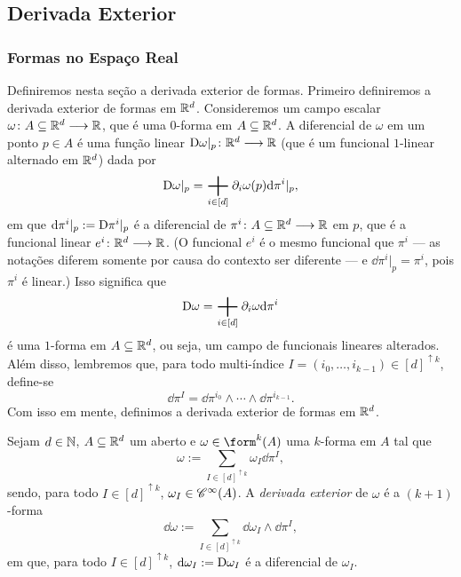 \subsection{Derivada Exterior}

\subsubsection{Formas no Espaço Real}

Definiremos nesta seção a derivada exterior de formas. Primeiro definiremos a derivada exterior de formas em $\mathbb{R}^d$. Consideremos um campo escalar $\omega\colon A \subseteq \mathbb{R}^d \longrightarrow \mathbb{R}$, que é uma $0$-forma em $A \subseteq \mathbb{R}^d$. A diferencial de $\omega$ em um ponto $p \in A$ é uma função linear $\mathrm{D} \omega|_p\colon \mathbb{R}^d \longrightarrow \mathbb{R}$ (que é um funcional $1$-linear alternado em $\mathbb{R}^d$) dada por
	\begin{equation*}
	\D \omega|_p = \sum_{i \in [d]} \partial_i \omega(p) \dd\pi^i|_p,
	\end{equation*}
em que $\mathrm{d}\pi^i|_p := \mathrm{D}\pi^i|_p$ é a diferencial de $\pi^i\colon A \subseteq \mathbb{R}^d \longrightarrow \mathbb{R}$ em $p$, que é a funcional linear $e^i\colon \mathbb{R}^d \longrightarrow \mathbb{R}$. (O funcional $e^i$ é o mesmo funcional que $\pi^i$ --- as notações diferem somente por causa do contexto ser diferente --- e $\dd\pi^i|_p=\pi^i$, pois $\pi^i$ é linear.) Isso significa que
	\begin{equation*}
	\D\omega = \sum_{i \in [d]} \partial_i \omega \dd\pi^i
	\end{equation*}
é uma $1$-forma em $A \subseteq \mathbb{R}^d$, ou seja, um campo de funcionais lineares alterados. Além disso, lembremos que, para todo multi-índice $I=(i_0,\ldots,i_{k-1}) \in [d]^{\uparrow k}$, define-se
	\begin{equation*}
	\dd\pi^I = \dd\pi^{i_0} \wedge \cdots \wedge \dd\pi^{i_{k-1}}.
	\end{equation*}
Com isso em mente, definimos a derivada exterior de formas em $\mathbb{R}^d$.

\begin{defi}
Sejam $d \in \mathbb{N}$, $A \subseteq \mathbb{R}^d$ um aberto e $\omega \in \form^k(A)$ uma $k$-forma em $A$ tal que
	\begin{equation*}
	\omega := \sum_{I \in [d]^{\uparrow k}} \omega_I \dd\pi^I,
	\end{equation*}
sendo, para todo $I \in [d]^{\uparrow k}$, $\omega_I \in \mathscr{C}^\infty(A)$. A \emph{derivada exterior} de $\omega$ é a $(k+1)$-forma
	\begin{equation*}
	\dd \omega := \sum_{I \in [d]^{\uparrow k}} \dd \omega_I \wedge \dd\pi^I,
	\end{equation*}
em que, para todo $I \in [d]^{\uparrow k}$, $\mathrm{d}\omega_I := \mathrm{D} \omega_I$ é a diferencial de $\omega_I$.
\end{defi}


